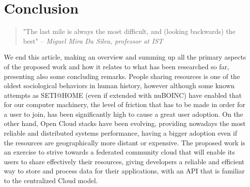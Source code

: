 

\chapter{Conclusion}
\label{ch:conclusion}

\begin{quotation}
  "The last mile is always the most difficult, and (looking backwards) the best"
  {\small\it -- Miguel Mira Da Silva, professor at IST}
\end{quotation}

We end this article, making an overview and summing up all the primary aspects of the proposed work and how it relates to what has been researched so far, presenting also some concluding remarks.
People sharing resources is one of the oldest sociological behaviors in human history, however although some known attempts as SETI@HOME (even if extended with nuBOINC) have enabled that for our computer machinery, the level of friction that has to be made in order for a user to join, has been significantly high to cause a great user adoption. On the other hand, Open Cloud stacks have been evolving, providing nowadays the most reliable and distributed systems performance, having a bigger adoption even if the resources are geographically more distant or expensive.
The proposed work is an exercise to strive towards a federated community cloud that will enable its users to share effectively their resources, giving developers a reliable and efficient way to store and process data for their applications, with an API that is familiar to the centralized Cloud model.
